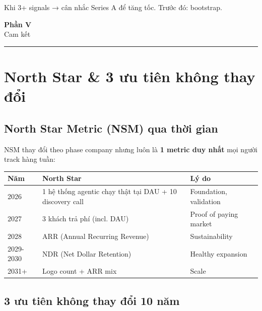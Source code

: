 \documentclass[11pt,a4paper]{article}
\begin{document}
Khi 3+ signals → cân nhắc Series A để tăng tốc. Trước đó: bootstrap.

\clearpage

\begin{center}
\vspace*{0.5em}
{\sffamily\bfseries\Huge\color{ink} Phần V}\\[0.5em]
{\sffamily\LARGE\color{mid} Cam kết}\\[0.5em]
{\color{ink}\rule{6cm}{0.4pt}}
\end{center}
\vspace{1em}

\section{North Star \& 3 ưu tiên không thay đổi}

\subsection{North Star Metric (NSM) qua thời gian}

NSM thay đổi theo phase company nhưng luôn là \textbf{1 metric duy nhất} mọi
người track hàng tuần:

\begin{tabularx}{\linewidth}{@{}p{2cm} X X@{}}
\toprule
\textbf{Năm} & \textbf{North Star} & \textbf{Lý do} \\
\midrule
2026 & 1 hệ thống agentic chạy thật tại DAU + 10 discovery call & Foundation, validation \\
2027 & 3 khách trả phí (incl. DAU) & Proof of paying market \\
2028 & ARR (Annual Recurring Revenue) & Sustainability \\
2029-2030 & NDR (Net Dollar Retention) & Healthy expansion \\
2031+ & Logo count + ARR mix & Scale \\
\bottomrule
\end{tabularx}

\subsection{3 ưu tiên không thay đổi 10 năm}
\end{document}
